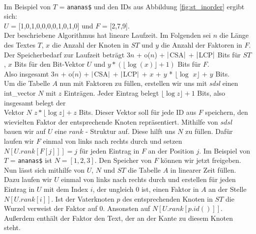 \documentclass[a4paper,11pt]{scrartcl}%
\theoremstyle{change}
\theoremstyle{nonumberplain}
\theoremstyle{change}
\theoremstyle{nonumberplain}
\theoremstyle{change}
\theoremstyle{nonumberplain}
\begin{document}
		\\Im Beispiel von $T$ = \texttt{ananas\$} und den IDs aus Abbildung \ref{fig:st_inorder}  ergibt sich: \\
		$U$ = [1,0,1,0,0,0,0,1,0,1,0] und $F$ = [2,7,9].\\
		
		Der beschriebene Algorithmus hat lineare Laufzeit. Im Folgenden sei $n$ die Länge des Textes $T$, $x$ die Anzahl der Knoten in $ST$ und $y$ die Anzahl der Faktoren in $F$.
		Der Speicherbedarf zur Laufzeit beträgt 3$n$ + o($n$) + $\arrowvert$CSA$\arrowvert$ + $\arrowvert$LCP$\arrowvert$ Bits für $ST$\cite{cheetsheet}, $x$ Bits für den Bit-Vektor $U$ und $y * (\lfloor\log(x)\rfloor+1)$ Bits für $F$. \\Also insgesamt 3$n$ + o($n$) + $\arrowvert$CSA$\arrowvert$ + $\arrowvert$LCP$\arrowvert$ + $x$ + $y$ * $\lfloor\log$ $x\rfloor$ + $y$ Bits.\\
		Um die Tabelle $A$ nun mit Faktoren zu füllen, erstellen wir uns mit \textit{sdsl} einen int\_vector $N$ mit $z$ Einträgen. Jeder Eintrag belegt $\lfloor \log z\rfloor + 1$ Bits, also insgesamt belegt der \\Vektor $N$ $z * \lfloor \log z\rfloor + z$ Bits. Dieser Vektor soll für jede ID aus $F$ speichern, den wievielten Faktor der entsprechende Knoten repräsentiert. Mithilfe von $sdsl$ bauen wir auf $U$ eine $rank$ - Struktur auf. Diese hilft uns $N$ zu füllen. Dafür laufen wir $F$ einmal von links nach rechts durch und setzen $N[U.rank[F[j]]] = j$ für jeden Eintrag in $F$ an der Position $j$. Im Beispiel von $T$ = \texttt{ananas\$} ist $N = [1,2,3]$.
		Den Speicher von $F$ können wir jetzt freigeben. Nun lässt sich mithilfe von $U$, $N$ und $ST$ die Tabelle $A$ in linearer Zeit füllen. Dazu laufen wir $U$ einmal von links nach rechts durch und erstellen für jeden Eintrag in $U$ mit dem Index $i$, der ungleich 0 ist, einen Faktor in $A$ an der Stelle $N[U.rank[i]]$. Ist der Vaterknoten $p$ des entsprechenden Knoten in $ST$ die Wurzel verweist der Faktor auf 0. Ansonsten auf $N[U.rank[p.id()]]$. Außerdem enthält der Faktor den Text, der an der Kante zu diesem Knoten steht.
\end{document}

